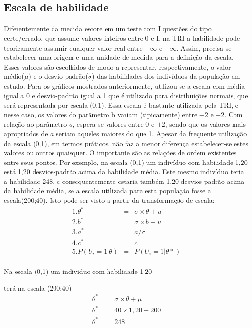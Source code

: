 	\subsection{Escala de habilidade}
	\paragraph{}
	    Diferentemente da medida escore em um teste com I questões do tipo
	    certo/errado, que assume valores inteiros entre 0 e I, na TRI a habilidade pode
	    teoricamente assumir qualquer valor real entre $+\displaystyle\infty$ e $-\displaystyle\infty$. Assim, precisa-se estabelecer uma origem e uma unidade de medida para a definição da escala. Esses valores são escolhidos de modo a representar, respectivamente, o valor médio($\mu$) e o desvio-padrão($\sigma$) das habilidades dos indivíduos da população em estudo. Para os gráficos mostrados anteriormente, utilizou-se a escala com média igual a 0 e desvio-padrão igual a 1 que é utilizado para distribuições normais, que será representada por escala (0,1). Essa escala é bastante utilizada pela TRI, e nesse caso, os valores do parâmetro b variam (tipicamente) entre $-2$ e $+2$. Com relação ao parâmetro $a$, espera-se valores entre $0$ e $+2$, sendo que os valores mais apropriados de $a$ seriam aqueles maiores do que 1. Apesar da frequente utilização da escala (0,1), em termos práticos, não faz a menor diferença estabelecer-se estes valores ou outros quaisquer. O importante são as relações de ordem existentes entre seus pontos. Por exemplo, na escala (0,1) um indivíduo com habilidade 1,20 está 1,20 desvios-padrão acima da habilidade média. Este mesmo indivíduo teria a habilidade 248, e consequentemente estaria também 1,20 desvios-padrão acima da habilidade média, se a escala utilizada para esta população fosse a escala(200;40). Isto pode ser visto a partir da transformação de escala:
	\begin{eqnarray}
		1.\theta^* & = & \sigma \times \theta + u\\
		2 .b^* & = & \sigma \times b + u\\
		3. a^* & = & a/\sigma\\
		4. c^* & = & c\\
		5. P(U_i = 1|\theta) & = & P(U_i = 1|\theta*)\\
	\end{eqnarray}
	
	Na escala (0,1) um individuo com habilidade 1.20
	
	terá na escala (200;40)
	\begin{eqnarray}
    	 \theta^* & = & \sigma \times \theta + \mu \nonumber\\
    	 \theta^* & = & 40 \times 1,20 + 200 \nonumber\\
    	 \theta^* & = & 248 \nonumber\\
	 \end{eqnarray}
